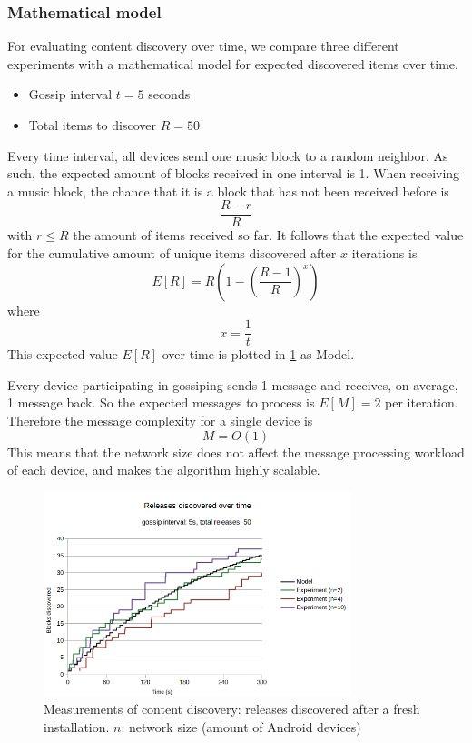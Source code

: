 \subsubsection{\textbf{Mathematical model}}
For evaluating content discovery over time, we compare three different experiments with a mathematical model for expected discovered items over time.

\begin{itemize}
    \item Gossip interval $t=5$ seconds
    \item Total items to discover $R=50$
\end{itemize}

Every time interval, all devices send one music block to a random neighbor. As such, the expected amount of blocks received in one interval is 1. When receiving a music block, the chance that it is a block that has not been received before is $$\frac{R-r}{R}$$ with $r\leq R$ the amount of items received so far. It follows that the expected value for the cumulative amount of unique items discovered after $x$ iterations is $$E[R]=R(1-(\frac{R-1}{R})^{x})$$ where $$x=\frac{1}{t}$$ This expected value $E[R]$ over time is plotted in \ref{fig:content-discovery} as Model.

Every device participating in gossiping sends 1 message and receives, on average, 1 message back. So the expected messages to process is $E[M]=2$ per iteration. Therefore the message complexity for a single device is $$M=O(1)$$ This means that the network size does not affect the message processing workload of each device, and makes the algorithm highly scalable.

\begin{figure}
    \centering
    \includegraphics[width=0.8\textwidth]{evaluation/expected-vs-simulated-releases-2.png}
    \caption{Measurements of content discovery: releases discovered after a fresh installation. $n$: network size (amount of Android devices)}
    \label{fig:content-discovery}
\end{figure}

